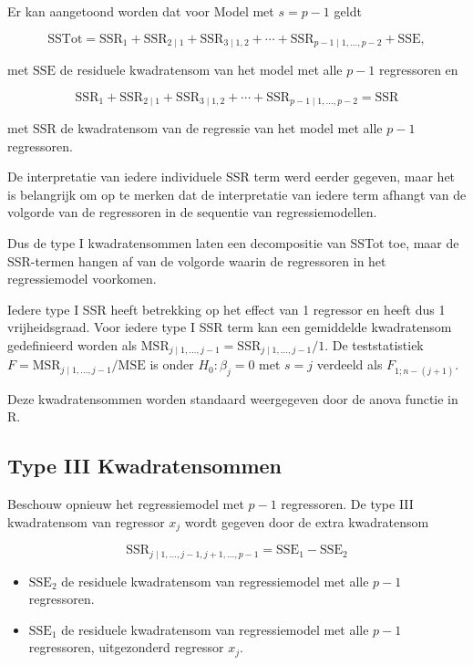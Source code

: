\documentclass[
  12pt,dutch,coursenotes]{book}
\providecommand{\tightlist}{%
  \setlength{\itemsep}{0pt}\setlength{\parskip}{0pt}}
\begin{document}
Er kan aangetoond worden dat voor Model met \(s=p-1\) geldt

\[
 \text{SSTot} = \text{SSR}_1 + \text{SSR}_{2\mid 1} + \text{SSR}_{3\mid 1,2} + \cdots + \text{SSR}_{p-1\mid 1,\ldots, p-2} + \text{SSE},
\]

met \(\text{SSE}\) de residuele kwadratensom van het model met alle \(p-1\) regressoren en

\[
  \text{SSR}_1 + \text{SSR}_{2\mid 1} + \text{SSR}_{3\mid 1,2} + \cdots + \text{SSR}_{p-1\mid 1,\ldots, p-2} = \text{SSR}
\]

met \(\text{SSR}\) de kwadratensom van de regressie van het model met alle \(p-1\) regressoren.

De interpretatie van iedere individuele SSR term werd eerder gegeven, maar het is belangrijk om op te merken dat de interpretatie van iedere term afhangt van de volgorde van de regressoren in de sequentie van regressiemodellen.

Dus de type I kwadratensommen laten een decompositie van SSTot toe, maar de SSR-termen hangen af van de volgorde waarin de regressoren in het regressiemodel voorkomen.

Iedere type I SSR heeft betrekking op het effect van 1 regressor en heeft dus 1 vrijheidsgraad.
Voor iedere type I SSR term kan een gemiddelde kwadratensom gedefinieerd worden als \(\text{MSR}_{j\mid 1,\ldots, j-1}=\text{SSR}_{j\mid 1,\ldots, j-1}/1\).
De teststatistiek \(F=\text{MSR}_{j\mid 1,\ldots, j-1}/\text{MSE}\) is onder \(H_0:\beta_j=0\) met \(s=j\) verdeeld als \(F_{1;n-(j+1)}\).

Deze kwadratensommen worden standaard weergegeven door de anova functie in R.

\hypertarget{type-iii-kwadratensommen}{%
\subsection{Type III Kwadratensommen}\label{type-iii-kwadratensommen}}

Beschouw opnieuw het regressiemodel met \(p-1\) regressoren.
De type III kwadratensom van regressor \(x_j\) wordt gegeven door de extra kwadratensom

\[
  \text{SSR}_{j \mid 1,\ldots, j-1,j+1,\ldots, p-1} = \text{SSE}_1-\text{SSE}_2
\]

\begin{itemize}
\tightlist
\item
  \(\text{SSE}_2\) de residuele kwadratensom van regressiemodel met alle \(p-1\) regressoren.
\item
  \(\text{SSE}_1\) de residuele kwadratensom van regressiemodel met alle \(p-1\) regressoren, uitgezonderd regressor \(x_j\).
\end{itemize}
\end{document}
